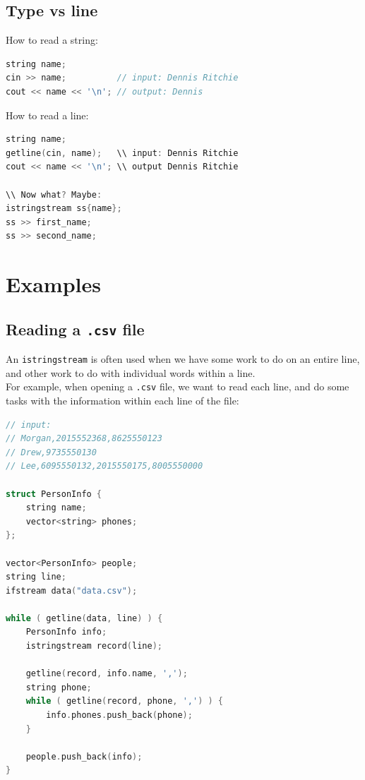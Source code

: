 \subsection{Type vs line}

How to read a string:

\begin{lstlisting}[language=C++]
string name;
cin >> name;          // input: Dennis Ritchie
cout << name << '\n'; // output: Dennis
\end{lstlisting}

How to read a line:

\begin{lstlisting}[language=C++]
string name;
getline(cin, name);   \\ input: Dennis Ritchie
cout << name << '\n'; \\ output Dennis Ritchie

\\ Now what? Maybe:
istringstream ss{name};
ss >> first_name;
ss >> second_name;
\end{lstlisting}

\section{Examples}

\subsection{Reading a \texttt{.csv} file}

An \texttt{istringstream} is often used when we have some work to do on an entire line, and other
work to do with individual words within a line.\\

For example, when opening a \texttt{.csv} file, we want to read each line, and do some tasks with
the information within each line of the file:\\

\begin{lstlisting}[language=C++]
// input:
// Morgan,2015552368,8625550123
// Drew,9735550130
// Lee,6095550132,2015550175,8005550000

struct PersonInfo {
    string name;
    vector<string> phones;
};

vector<PersonInfo> people;
string line;
ifstream data("data.csv");

while ( getline(data, line) ) {
    PersonInfo info;
    istringstream record(line);

    getline(record, info.name, ',');
    string phone;
    while ( getline(record, phone, ',') ) {
        info.phones.push_back(phone);
    }

    people.push_back(info);
}
\end{lstlisting}

